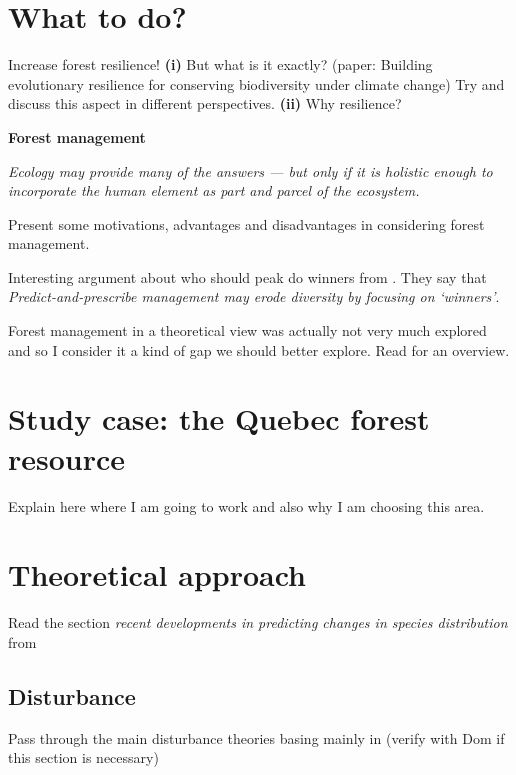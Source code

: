 \section{What to do?}

Increase forest resilience! \textbf{(i)} But what is it exactly? (paper: Building evolutionary resilience for conserving biodiversity under climate change) Try and discuss this aspect in different perspectives. \textbf{(ii)} Why resilience?

\textbf{Forest management}

\begin{displayquote}
\centering\textit{Ecology may provide many of the answers — but only if it is holistic enough to incorporate the human element as part and parcel of the ecosystem.} \\ \RaggedLeft\textit{\citep[p. 231]{Pfister1993}}
\end{displayquote}

Present some motivations, advantages and disadvantages in considering forest management.

Interesting argument about who should peak do winners from \cite{Webster2017}. They say that \textit{Predict-and-prescribe management may erode diversity by focusing on ‘winners’}.

Forest management in a theoretical view was actually not very much explored and so I consider it a kind of gap we should better explore. Read \cite{Becknell2015} for an overview.

\section{Study case: the Quebec forest resource}

Explain here where I am going to work and also why I am choosing this area.

\section{Theoretical approach}

Read the section \textit{recent developments in predicting changes in species distribution} from \cite{Ehrlen2015}

\subsection*{Disturbance}
Pass through the main disturbance theories basing mainly in \cite{Pulsford2016} (verify with Dom if this section is necessary)

